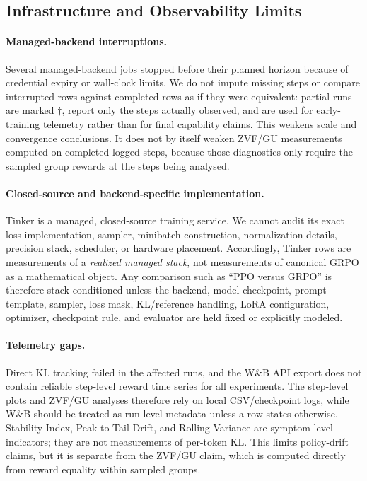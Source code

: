 \documentclass{article}
\begin{document}
\subsection{Infrastructure and Observability Limits}
\label{sec:infra_failures}

\paragraph{Managed-backend interruptions.}
Several managed-backend jobs stopped before their planned horizon because of
credential expiry or wall-clock limits.  We do not impute missing steps or
compare interrupted rows against completed rows as if they were equivalent:
partial runs are marked $\dagger$, report only the steps actually observed, and
are used for early-training telemetry rather than for final capability claims.
This weakens scale and convergence conclusions.  It does not by itself weaken
ZVF/GU measurements computed on completed logged steps, because those diagnostics
only require the sampled group rewards at the steps being analysed.

\paragraph{Closed-source and backend-specific implementation.}
Tinker is a managed, closed-source training service.  We cannot audit its exact
loss implementation, sampler, minibatch construction, normalization details,
precision stack, scheduler, or hardware placement.  Accordingly, Tinker rows are
measurements of a \emph{realized managed stack}, not measurements of canonical
GRPO as a mathematical object.  Any comparison such as ``PPO versus GRPO'' is
therefore stack-conditioned unless the backend, model checkpoint, prompt
template, sampler, loss mask, KL/reference handling, LoRA configuration,
optimizer, checkpoint rule, and evaluator are held fixed or explicitly modeled.

\paragraph{Telemetry gaps.}
Direct KL tracking failed in the affected runs, and the W\&B API export does
not contain reliable step-level reward time series for all experiments.  The
step-level plots and ZVF/GU analyses therefore rely on local CSV/checkpoint
logs, while W\&B should be treated as run-level metadata unless a row states
otherwise.  Stability Index, Peak-to-Tail Drift, and Rolling Variance are
symptom-level indicators; they are not measurements of per-token
KL.  This limits policy-drift claims, but it is separate from the ZVF/GU claim,
which is computed directly from reward equality within sampled groups.
\end{document}
